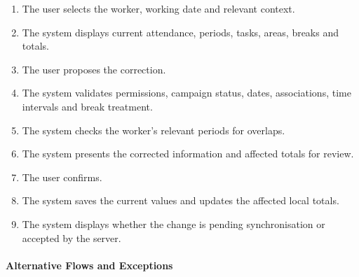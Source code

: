 \begin{enumerate}
    \item The user selects the worker,
    working date and relevant context.
    \item The system displays current attendance,
    periods, tasks, areas, breaks and totals.
    \item The user proposes the correction.
    \item The system validates permissions,
    campaign status, dates, associations,
    time intervals and break treatment.
    \item The system checks the worker's
    relevant periods for overlaps.
    \item The system presents the corrected
    information and affected totals for review.
    \item The user confirms.
    \item The system saves the current values
    and updates the affected local totals.
    \item The system displays whether the change
    is pending synchronisation or accepted
    by the server.
\end{enumerate}

\paragraph{Alternative Flows and Exceptions}

